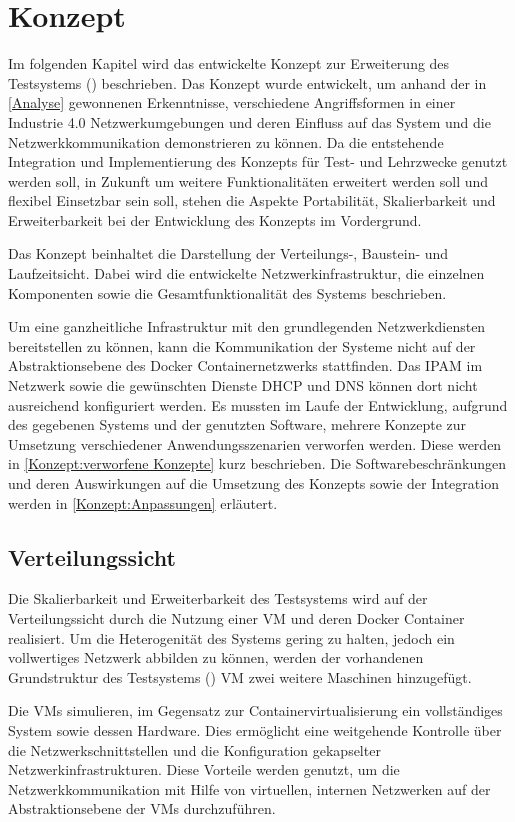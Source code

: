 \chapter{Konzept}
\label{Konzept}
Im folgenden Kapitel wird das entwickelte Konzept zur Erweiterung des Testsystems (\cite{Weber2018}) beschrieben. Das Konzept wurde entwickelt, um anhand der in \autoref{Analyse} gewonnenen Erkenntnisse, verschiedene Angriffsformen in einer Industrie 4.0 Netzwerkumgebungen und deren Einfluss auf das System und die Netzwerkkommunikation demonstrieren zu können. Da die entstehende Integration und Implementierung des Konzepts für Test- und Lehrzwecke genutzt werden soll, in Zukunft um weitere Funktionalitäten erweitert werden soll und flexibel Einsetzbar sein soll, stehen die Aspekte Portabilität, Skalierbarkeit und Erweiterbarkeit bei der Entwicklung des Konzepts im Vordergrund.

Das Konzept beinhaltet die Darstellung der Verteilungs-, Baustein- und Laufzeitsicht. Dabei wird die entwickelte Netzwerkinfrastruktur, die einzelnen Komponenten sowie die Gesamtfunktionalität des Systems beschrieben.

Um eine ganzheitliche Infrastruktur mit den grundlegenden Netzwerkdiensten bereitstellen zu können, kann die Kommunikation der Systeme nicht auf der Abstraktionsebene des Docker Containernetzwerks stattfinden. Das \ac{IPAM} im Netzwerk sowie die gewünschten Dienste \ac{DHCP} und \ac{DNS} können dort nicht ausreichend konfiguriert werden. Es mussten im Laufe der Entwicklung, aufgrund des gegebenen Systems und der genutzten Software, mehrere Konzepte zur Umsetzung verschiedener Anwendungsszenarien verworfen werden. Diese werden in \autoref{Konzept:verworfene Konzepte} kurz beschrieben. Die Softwarebeschränkungen und deren Auswirkungen auf die Umsetzung des Konzepts sowie der Integration werden in \autoref{Konzept:Anpassungen} erläutert.

\section{Verteilungssicht}
Die Skalierbarkeit und Erweiterbarkeit des Testsystems wird auf der Verteilungssicht durch die Nutzung einer \ac{VM} und deren Docker Container realisiert. Um die Heterogenität des Systems gering zu halten, jedoch ein vollwertiges Netzwerk abbilden zu können, werden der vorhandenen Grundstruktur des Testsystems (\cite{Weber2018}) \ac{VM} zwei weitere Maschinen hinzugefügt.

Die \ac{VM}s simulieren, im Gegensatz zur Containervirtualisierung ein vollständiges System sowie dessen Hardware. Dies ermöglicht eine weitgehende Kontrolle über die Netzwerkschnittstellen und die Konfiguration gekapselter Netzwerkinfrastrukturen. Diese Vorteile werden genutzt, um die Netzwerkkommunikation mit Hilfe von virtuellen, internen Netzwerken auf der Abstraktionsebene der \ac{VM}s durchzuführen.

